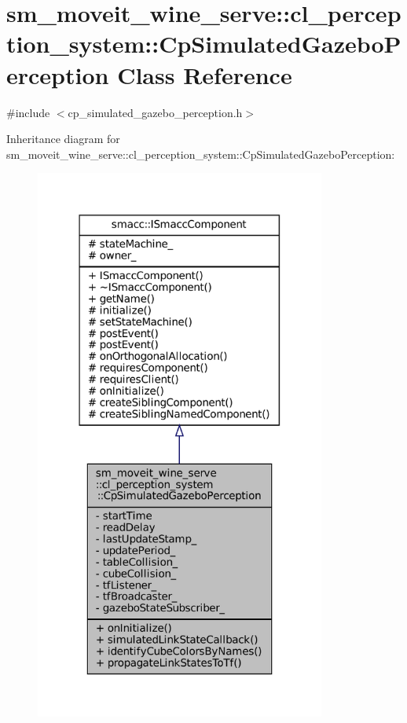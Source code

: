 \hypertarget{classsm__moveit__wine__serve_1_1cl__perception__system_1_1CpSimulatedGazeboPerception}{}\section{sm\+\_\+moveit\+\_\+wine\+\_\+serve\+:\+:cl\+\_\+perception\+\_\+system\+:\+:Cp\+Simulated\+Gazebo\+Perception Class Reference}
\label{classsm__moveit__wine__serve_1_1cl__perception__system_1_1CpSimulatedGazeboPerception}


{\ttfamily \#include $<$cp\+\_\+simulated\+\_\+gazebo\+\_\+perception.\+h$>$}



Inheritance diagram for sm\+\_\+moveit\+\_\+wine\+\_\+serve\+:\+:cl\+\_\+perception\+\_\+system\+:\+:Cp\+Simulated\+Gazebo\+Perception\+:
\nopagebreak
\begin{figure}[H]
\begin{center}
\leavevmode
\includegraphics[width=271pt]{classsm__moveit__wine__serve_1_1cl__perception__system_1_1CpSimulatedGazeboPerception__inherit__graph}
\end{center}
\end{figure}


